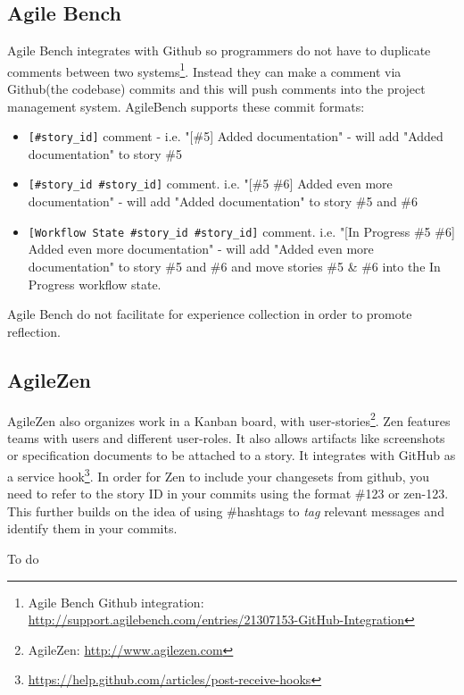 \subsection*{Agile Bench}
Agile Bench integrates with Github so programmers do not have to duplicate comments between two systems\footnote{Agile Bench Github integration: \url{http://support.agilebench.com/entries/21307153-GitHub-Integration}}. Instead they can make a comment via Github(the codebase) commits and this will push comments into the project management system. AgileBench supports these commit formats:
\begin{itemize}
\item \verb|[#story_id]| comment - i.e. "[\#5] Added documentation" - will add "Added documentation" to story \#5
\item \verb|[#story_id #story_id]| comment. i.e. "[\#5 \#6] Added even more documentation" - will add "Added documentation" to story \#5 and \#6
\item \verb|[Workflow State #story_id #story_id]| comment. i.e. "[In Progress \#5 \#6] Added even more documentation" - will add "Added even more documentation" to story \#5 and \#6 and move stories \#5 \& \#6 into the In Progress workflow state.
\end{itemize}
Agile Bench do not facilitate for experience collection in order to promote reflection.
\subsection*{AgileZen}
AgileZen also organizes work in a Kanban board, with user-stories\footnote{AgileZen: \url{http://www.agilezen.com}}. Zen features teams with users and different user-roles. It also allows artifacts like screenshots or specification documents to be attached to a story. It integrates with GitHub as a service hook\footnote{\url{https://help.github.com/articles/post-receive-hooks}}. In order for Zen to include your changesets from github, you need to refer to the story ID in your commits using the format \#123 or zen-123. This further builds on the idea of using \#hashtags to \textit{tag} relevant messages and identify them in your commits. 


To do

